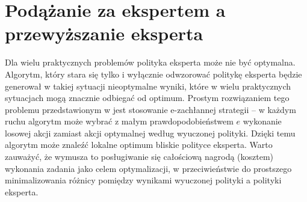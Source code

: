 \section{Podążanie za ekspertem a przewyższanie eksperta}
Dla wielu praktycznych problemów polityka eksperta może nie być optymalna. Algorytm, który stara się tylko i wyłącznie odwzorować politykę eksperta będzie generował w takiej sytuacji nieoptymalne wyniki, które w wielu praktycznych sytuacjach mogą znacznie odbiegać od optimum. Prostym rozwiązaniem tego problemu przedstawionym w \cite{DBLP:journals/corr/ChangKADL15} jest stosowanie e-zachłannej strategii – w każdym ruchu algorytm może wybrać z małym prawdopodobieństwem $e$ wykonanie losowej akcji zamiast akcji optymalnej według wyuczonej polityki. Dzięki temu algorytm może znaleźć lokalne optimum bliskie polityce eksperta. Warto zauważyć, że wymusza to posługiwanie się całościową nagrodą (kosztem) wykonania zadania jako celem optymalizacji, w przeciwieństwie do prostszego minimalizowania różnicy pomiędzy wynikami wyuczonej polityki a polityki eksperta.
